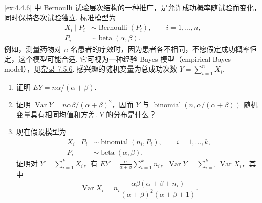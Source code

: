 \begin{exercise}\label{exercise:4.36}
\autoref{ex:4.4.6} 中 Bernoulli 试验层次结构的一种推广，是允许成功概率随试验而变化，同时保持各次试验独立. 标准模型为
$$\begin{aligned}X_i\mid P_i&\sim\operatorname{Bernoulli}(P_i),\qquad i=1,\ldots,n,\\P_i&\sim\operatorname{beta}(\alpha,\beta).\end{aligned}$$
例如，测量药物对 $n$ 名患者的疗效时，因为患者各不相同，不愿假定成功概率恒定，这个模型可能合适. 它可视为一种经验 Bayes 模型（empirical Bayes model），见\hyperref[sec:7.5.6]{杂录 7.5.6}. 感兴趣的随机变量为总成功次数 $Y=\sum_{i=1}^nX_i$.
\begin{enumerate}
\item[(a)] 证明 $EY=n\alpha/(\alpha+\beta)$.
\item[(b)] 证明 $\operatorname{Var}Y=n\alpha\beta/(\alpha+\beta)^2$，因而 $Y$ 与 $\operatorname{binomial}(n,\alpha/(\alpha+\beta))$ 随机变量具有相同均值和方差. $Y$ 的分布是什么？
\item[(c)] 现在假设模型为
$$\begin{aligned}X_i\mid P_i&\sim\operatorname{binomial}(n_i,P_i),\qquad i=1,\ldots,k,\\P_i&\sim\operatorname{beta}(\alpha,\beta).\end{aligned}$$
证明对 $Y=\sum_{i=1}^kX_i$，有 $EY=\frac\alpha{\alpha+\beta}\sum_{i=1}^kn_i$，$\operatorname{Var}Y=\sum_{i=1}^k\operatorname{Var}X_i$，其中
$$\operatorname{Var}X_i=n_i\frac{\alpha\beta(\alpha+\beta+n_i)}{(\alpha+\beta)^2(\alpha+\beta+1)}.$$
\end{enumerate}
\end{exercise}

